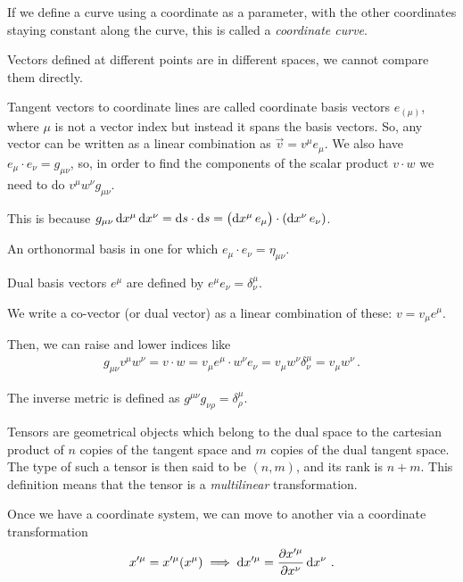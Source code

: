 \documentclass[main.tex]{subfiles}
\begin{document}
If we define a curve using a coordinate as a parameter, with the other coordinates staying constant along the curve, this is called a \emph{coordinate curve}. 

Vectors defined at different points are in different spaces, we cannot compare them directly. 

Tangent vectors to coordinate lines are called coordinate basis vectors \(e_{(\mu )}\), where \(\mu \) is not a vector index but instead it spans the basis vectors. So, any vector can be written as a linear combination as \(\vec{v} = v^{\mu } e_{\mu }\).
We also have \(e_{\mu } \cdot e_{\nu } = g_{\mu \nu }\), so, in order to find the components of the scalar product \(v \cdot w\) we need to do \(v^{\mu } w^{\nu } g_{\mu \nu  }\). 

This is because \(g_{\mu \nu } \dd{x^{\mu } } \dd{x^{\nu }} = \dd{s} \cdot \dd{s} = \qty(\dd{x^{\mu }} e_{\mu }) \cdot \qty(\dd{x^{\nu }} e_{\nu })\). 

An orthonormal basis in one for which \(e_{\mu } \cdot e_{\nu } = \eta_{\mu \nu }\). 

Dual basis vectors \(e^{\mu }\) are defined by \(e^{\mu } e_{\nu } = \delta^{\mu }_{\nu }\). 

We write a co-vector (or dual vector) as a linear combination of these: \(v = v_{\mu } e^{\mu }\). 

Then, we can raise and lower indices like 
%
\begin{align}
g_{\mu \nu } v^{\mu } w^{\nu } = v \cdot w = v_{\mu } e^{\mu } \cdot w^{\nu } e_{\nu } = v_{\mu } w^{\nu } \delta^{\mu }_{\nu } = v_{\mu } w^{\nu }
\,.
\end{align}

The inverse metric is defined as \(g^{\mu \nu } g_{\nu \rho } = \delta^{\mu }_{\rho }\). 

Tensors are geometrical objects which belong to the dual space to the cartesian product of \(n\) copies of the tangent space and \(m\) copies of the dual tangent space. 
The type of such a tensor is then said to be  \((n, m)\), and its rank is \(n+m\). 
This definition means that the tensor is a \emph{multilinear} transformation. 

Once we have a coordinate system, we can move to another via a coordinate transformation 
%
\begin{align}
x^{\prime \mu } = x^{\prime \mu } \qty(x^{\mu })
\implies 
\dd{x^{\prime \mu }} = \pdv{x^{\prime \mu }}{x^{\nu }} \dd{x^{\nu }}
\,.
\end{align}
\end{document}
